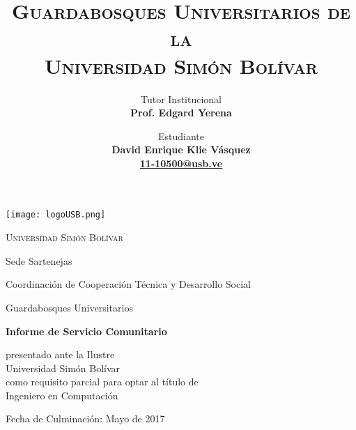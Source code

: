 \documentclass[12pt,letter]{article}
\title{\Large\bfseries\scshape{Guardabosques Universitarios de la \\ Universidad Simón Bolívar\vspace{1cm}}}
\author{
  Tutor Institucional\\
  \bfseries{Prof. Edgard Yerena}
  \and
  \and
  \and
  \and
  Estudiante\\
  \bfseries{David Enrique Klie Vásquez}\\
  \protect\url{11-10500@usb.ve}
}
\date{}
\begin{document}
\begin{titlepage}

    \centering
    \texttt{[image: logoUSB.png]}\par\vspace{1cm}

    {\scshape\Large Universidad Simón Bolívar \par}
    \vspace{0.2cm}
    {Sede Sartenejas \par}
    {Coordinación de Cooperación Técnica y Desarrollo Social \par}
    {Guardabosques Universitarios \par}

    {\let\newpage\relax\maketitle}
    \thispagestyle{empty}

    \vfill

    \vspace{2cm}

    {\bfseries{Informe de Servicio Comunitario} \par}
    {presentado ante la Ilustre \\ Universidad Simón Bolívar \\ como requisito parcial para optar al título de \\ Ingeniero en Computación \par}

    \vfill

    {\large Fecha de Culminación: Mayo de 2017}

\end{titlepage}
\end{document}
